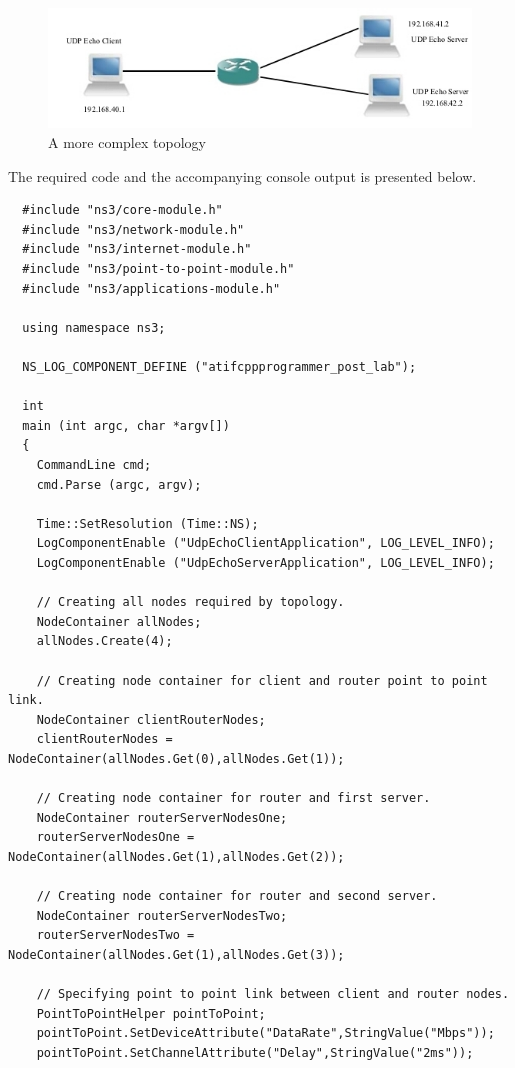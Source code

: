 \documentclass[fullpage]{article}
\begin{document}
\begin{figure}[H]
  \includegraphics[width=\linewidth]{topologyPostLabQuestion.png}
  \caption{A more complex topology}
  \label{fig:output2}
\end{figure}

The required code and the accompanying console output is presented below.

\begin{verbatim}
  #include "ns3/core-module.h"
  #include "ns3/network-module.h"
  #include "ns3/internet-module.h"
  #include "ns3/point-to-point-module.h"
  #include "ns3/applications-module.h"

  using namespace ns3;

  NS_LOG_COMPONENT_DEFINE ("atifcppprogrammer_post_lab");

  int
  main (int argc, char *argv[])
  {
    CommandLine cmd;
    cmd.Parse (argc, argv);

    Time::SetResolution (Time::NS);
    LogComponentEnable ("UdpEchoClientApplication", LOG_LEVEL_INFO);
    LogComponentEnable ("UdpEchoServerApplication", LOG_LEVEL_INFO);

    // Creating all nodes required by topology.
    NodeContainer allNodes;
    allNodes.Create(4);

    // Creating node container for client and router point to point link.
    NodeContainer clientRouterNodes;
    clientRouterNodes = NodeContainer(allNodes.Get(0),allNodes.Get(1));

    // Creating node container for router and first server.
    NodeContainer routerServerNodesOne;
    routerServerNodesOne = NodeContainer(allNodes.Get(1),allNodes.Get(2));

    // Creating node container for router and second server.
    NodeContainer routerServerNodesTwo;
    routerServerNodesTwo = NodeContainer(allNodes.Get(1),allNodes.Get(3));

    // Specifying point to point link between client and router nodes.
    PointToPointHelper pointToPoint;
    pointToPoint.SetDeviceAttribute("DataRate",StringValue("Mbps"));
    pointToPoint.SetChannelAttribute("Delay",StringValue("2ms"));


\end{verbatim}
\end{document}
